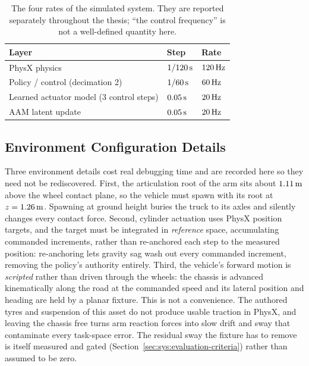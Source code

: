 \begin{table}[tb]
  \centering
  \caption{The four rates of the simulated system. They are reported
  separately throughout the thesis; ``the control frequency'' is not a
  well-defined quantity here.}
  \label{tab:sys:rates}
  \small
  \begin{tabular}{lll}
    \toprule
    Layer & Step & Rate \\
    \midrule
    PhysX physics                & $\unit[1/120]{s}$   & $\unit[120]{Hz}$ \\
    Policy / control (decimation 2) & $\unit[1/60]{s}$ & $\unit[60]{Hz}$ \\
    Learned actuator model (3 control steps) & $\unit[0.05]{s}$ & $\unit[20]{Hz}$ \\
    AAM latent update            & $\unit[0.05]{s}$    & $\unit[20]{Hz}$ \\
    \bottomrule
  \end{tabular}
\end{table}

\subsection{Environment Configuration Details}

Three environment details cost real debugging time and are recorded
here so they need not be rediscovered. First, the articulation root of
the arm sits about $\unit[1.11]{m}$ above the wheel contact plane, so
the vehicle must spawn with its root at $z = \unit[1.26]{m}$. Spawning
at ground height buries the truck to its axles and silently changes
every contact force. Second, cylinder actuation uses PhysX position
targets, and the target must be integrated in \emph{reference} space,
accumulating commanded increments, rather than re-anchored each step to
the measured position: re-anchoring lets gravity sag wash out every
commanded increment, removing the policy's authority entirely. Third,
the vehicle's forward motion is \emph{scripted} rather than driven
through the wheels: the chassis is advanced kinematically along the road
at the commanded speed and its lateral position and heading are held by
a planar fixture. This is not a convenience. The authored tyres and
suspension of this asset do not produce usable traction in PhysX, and
leaving the chassis free turns arm reaction forces into slow drift and
sway that contaminate every task-space error. The residual sway the
fixture has to remove is itself measured and gated
(Section~\ref{sec:sys:evaluation-criteria}) rather than assumed to be
zero.

